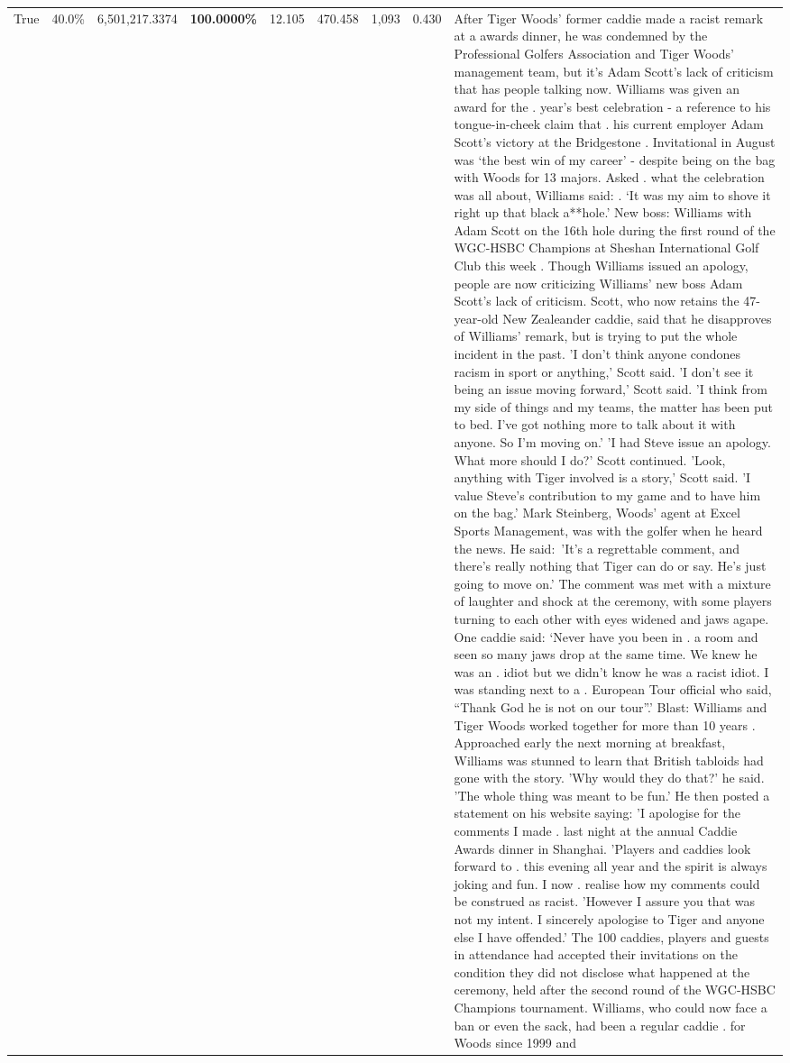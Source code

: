 \begin{table}[H]
\begin{tabular}{lllrlllll}
True & 40.0\% & 6,501,217.3374 & \bfseries \color{red} 100.0000\% & 12.105 & 470.458 & 1,093 & 0.430 & After Tiger Woods' former caddie made a racist remark at a awards dinner, he was condemned by the Professional Golfers Association and Tiger Woods' management team, but it's Adam Scott's lack of criticism that has people talking now. Williams was given an award for the . year’s best celebration - a reference to his tongue-in-cheek claim that . his current employer Adam Scott’s victory at the Bridgestone . Invitational in August was ‘the best win of my career’ - despite being on the bag with Woods for 13 majors. Asked . what the celebration was all about, Williams said: . ‘It was my aim to shove it right up that black a**hole.’ New boss: Williams with Adam Scott  on the 16th hole during the first round of the WGC-HSBC Champions at Sheshan International Golf Club this week . Though Williams issued an apology, people are now criticizing Williams' new boss Adam Scott's lack of criticism. Scott, who now retains the 47-year-old New Zealeander caddie, said that he disapproves of Williams' remark, but is trying to put the whole incident in the past. 'I don't think anyone condones racism in sport or anything,' Scott said. 'I don't see it being an issue moving forward,' Scott said. 'I think from my side of things and my teams, the matter has been put to bed. I've got nothing more to talk about it with anyone. So I'm moving on.' 'I had Steve issue an apology. What more should I do?' Scott continued. 'Look, anything with Tiger involved is a story,' Scott said. 'I value Steve's contribution to my game and to have him on the bag.' Mark Steinberg, Woods' agent at Excel Sports Management, was with the golfer when he heard the news. He said: 'It's a regrettable comment, and there's really nothing that Tiger can do or say. He's just going to move on.' The comment was met with a mixture of laughter and shock at the ceremony, with some players turning to each other with eyes widened and jaws agape. One caddie said: ‘Never have you been in . a room and seen so many jaws drop at the same time. We knew he was an . idiot but we didn’t know he was a racist idiot. I was standing next to a . European Tour official who said, “Thank God he is not on our tour”.’ Blast: Williams and Tiger Woods worked together for more than 10 years . Approached early the next morning at breakfast, Williams was stunned to learn that British tabloids had gone with the story. 'Why would they do that?' he said. 'The whole thing was meant to be fun.' He then posted a statement on his website saying: 'I apologise for the comments I made . last night at the annual Caddie Awards dinner in Shanghai. 'Players and caddies look forward to . this evening all year and the spirit is always joking and fun. I now . realise how my comments could be construed as racist. 'However I assure you that was not my intent. I sincerely apologise to Tiger and anyone else I have offended.' The 100 caddies, players and guests in attendance had accepted their invitations on the condition they did not disclose what happened at the ceremony, held after the second round of the WGC-HSBC Champions tournament. Williams, who could now face a ban or even the sack, had been a regular caddie . for Woods since 1999 and 
\end{tabular}
\end{table}

